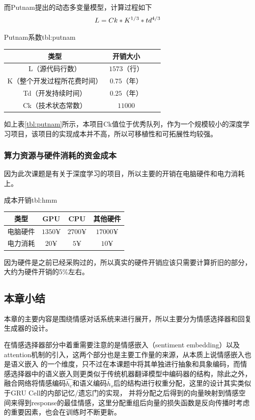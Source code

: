\documentclass[supercite]{HustGraduPaper}
\theoremstyle{definition}
\begin{document}
而Putnam提出的动态多变量模型，计算过程如下
\begin{align}
  L = Ck * K^{1/3} * td^{4/3} \notag
\end{align}

\begin{generaltab}{Putnam系数}{tbl:putnam}
  \begin{tabular}{c|ccc}
    \toprule
    类型 & 开销大小 \\
    \midrule
    L（源代码行数） & $1573$（行） \\
    K（整个开发过程所花费时间） & $0.75$（年）\\
    Td（开发持续时间）& $0.25$（年）\\
    Ck（技术状态常数）& $11000$ \\
    \bottomrule
  \end{tabular}
\end{generaltab}
如上表\ref{tbl:putnam}所示，本项目Ck值位于优秀队列，作为一个规模较小的深度学习项目，该项目的实现成本并不高，所以可移植性和可拓展性均较强。

\subsubsection{算力资源与硬件消耗的资金成本}
因为此次课题是有关于深度学习的项目，所以主要的开销在电脑硬件和电力消耗上。
\begin{generaltab}{成本开销}{tbl:hmm}
  \begin{tabular}{c|ccc}
    \toprule
    类型 & GPU & CPU & 其他硬件 \\
    \midrule
    电脑硬件 & $1350¥$ & $2700¥$ & $17000¥$ \\
    电力消耗 & $20¥$ & $5¥$ & $10¥$ \\
    \bottomrule
  \end{tabular}
\end{generaltab}
因为硬件是之前已经采购过的，所以真实的硬件开销应该只需要计算折旧的部分，大约为硬件开销的5\%左右。


\subsection{本章小结}
本章的主要内容是围绕情感对话系统来进行展开，所以主要分为情感选择器和回复生成器的设计。

在情感选择器部分中着重需要注意的是情感嵌入（sentiment embedding）以及attention机制的引入，这两个部分也是主要工作量的来源，从本质上说情感嵌入也是语义嵌入
的一个维度，只不过在本课题中将其单独进行抽象和具象编码，而情感选择器中的语义嵌入则更类似于传统机器翻译模型中编码器的结构，除此之外，
融合网络将情感编码$\widehat{h_e}$和语义编码$\widetilde{h_s}$后的结构进行权重分配，这里的设计其实类似于GRU Cell的内部记忆/遗忘门的实现，
并将分配之后得到的向量映射到情感空间来得到response的最佳情感，这里分配重组后向量的损失函数是反向传播时考虑的重要因素，也会在训练时不断更新。
\end{document}
